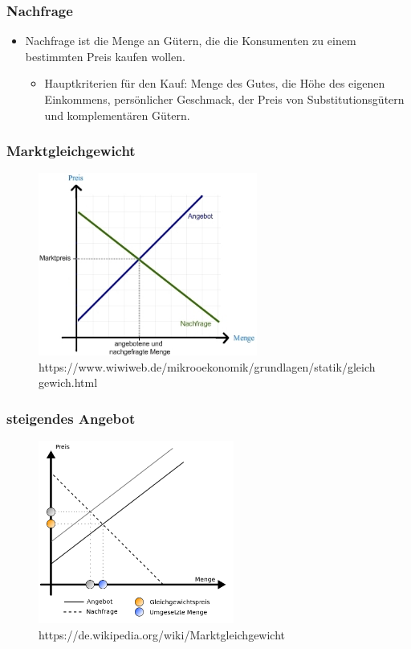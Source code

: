 \documentclass{beamer}
\begin{document}
\begin{frame}
\frametitle{Nachfrage}
  \begin{itemize}
    \item
Nachfrage ist die Menge an Gütern, die die
Konsumenten zu einem bestimmten Preis kaufen wollen.

      \begin{itemize}
        \item
Hauptkriterien für den Kauf: Menge des Gutes, die Höhe des
eigenen Einkommens, persönlicher Geschmack, der Preis von
Substitutionsgütern und komplementären Gütern.
      \end{itemize}
  \end{itemize}
\end{frame}

\begin{frame}
\frametitle{Marktgleichgewicht}
  \begin{figure}[h]
    \centering
    \includegraphics[height=6cm]{marktgleichgewicht}
    \caption{https://www.wiwiweb.de/mikrooekonomik/grundlagen/statik/gleichgewich.html}
  \end{figure}
\end{frame}
\begin{frame}
\frametitle{steigendes Angebot}
  \begin{figure}[h]
    \centering
    \includegraphics[height=6cm]{steigendes_angebot}
    \caption{https://de.wikipedia.org/wiki/Marktgleichgewicht}
  \end{figure}
\end{frame}
\end{document}
